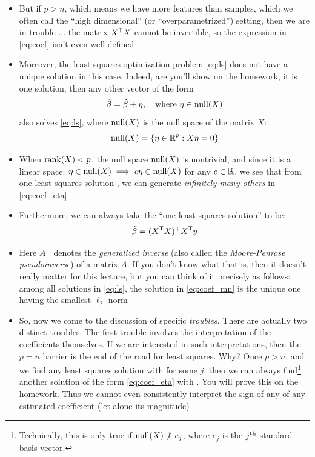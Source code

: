 \documentclass{article}
\begin{document}
\begin{itemize}
\item But if $p > n$, which means we have more features than samples, which we 
  often call the ``high dimensional'' (or ``overparametrized'') setting, then we 
  are in trouble ... the matrix $X^{\mathsf{T}} X$ cannot be invertible, so the expression
  in \eqref{eq:coef} isn't even well-defined   

\item Moreover, the least squares optimization problem \eqref{eq:ls} does not
  have a unique solution in this case. Indeed, are you'll show on the homework,
  it \smash{$\tilde\beta$} is one solution, then any other vector of the form    
  \begin{equation}
  \label{eq:coef_eta}
  \hat{\beta} = \tilde\beta + \eta, \quad \text{where $\eta \in \operatorname{null}(X)$}
  \end{equation}
  also solves \eqref{eq:ls}, where $\operatorname{null}(X)$ is the null space of the matrix
  $X$:
  \[
  \operatorname{null}(X) = \{ \eta \in \mathbb{R}^p : X \eta = 0 \} 
  \]

\item When $\operatorname{rank}(X) < p$, the null space $\operatorname{null}(X)$ is nontrivial, and since it  
  is a linear space: $\eta \in \operatorname{null}(X) \implies c \eta \in \operatorname{null}(X)$ for any $c
  \in \mathbb{R}$, we see that from one least squares solution \smash{$\tilde\beta$}, we
  can generate \emph{infinitely many others} in \eqref{eq:coef_eta} 
  
\item Furthermore, we can always take the ``one least squares solution'' to be:  
  \begin{equation}
  \label{eq:coef_mn}
  \tilde\beta = (X^{\mathsf{T}} X)^+ X^{\mathsf{T}} y
  \end{equation}

  \item Here $A^+$ denotes the \emph{generalized inverse} (also called the 
  \emph{Moore-Penrose pseudoinverse}) of a matrix $A$. If you don't know what
  that is, then it doesn't really matter for this lecture, but you can think of
  it precisely as follows: among all solutions in \eqref{eq:ls}, the solution in
  \eqref{eq:coef_mn} is the unique one having the smallest $\ell_2$ norm 

\item So, now we come to the discussion of specific \emph{troubles}. There are
  actually two distinct troubles. The first trouble involves the interpretation
  of the coefficients themselves. If we are interested in such interpretations,
  then the $p = n$ barrier is the end of the road for least squares. Why? Once
  $p > n$, and we find any least squares solution \smash{$\tilde\beta$} with
   for some $j$, then we can always
  find\footnote{Technically, this is only true if $\operatorname{null}(X) \not \perp e_j$,
    where $e_j$ is the $j^{\textnormal{th}}$ standard basis vector.}  
  another solution \smash{$\hbeta$} of the form \eqref{eq:coef_eta} with
  . You will prove this on the homework. Thus we cannot
  even consistently interpret the sign of any of any estimated coefficient (let
  alone its magnitude) 


\end{itemize}
\end{document}
